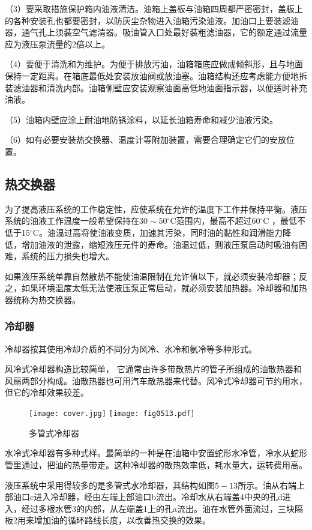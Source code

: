 （3）要采取措施保护箱内油液清洁。油箱上盖板与油箱四周都严密密封，盖板上的各种安装孔也都要密封，以防灰尘杂物进入油箱污染油液。加油口上要装滤油器，通气孔上须装空气滤清器。吸油管入口处最好装粗滤油器，它的额定通过流量应为液压泵流量的2倍以上。

（4）要便于清洗和为维护。为便于排放污油，油箱箱底应做成倾斜形，且与地面保持一定距离。在箱底最低处安装放油阀或放油塞。油箱结构还应考虑能方便地拆装滤油器和清洗内部。油箱侧壁应安装观察油面高低地油面指示器，以便适时补充油液。

（5）油箱内壁应涂上耐油地防锈涂料，以延长油箱寿命和减少油液污染。

（6）如有必要安装热交换器、温度计等附加装置，需要合理确定它们的安放位置。

\subsection{热交换器}

为了提高液压系统的工作稳定性，应使系统在允许的温度下工作并保持平衡。液压系统的油液工作温度一般希望保持在$30 \sim 50^\circ$C范围内，最高不超过60$^\circ$C ，最低不低于15$^\circ$C。油温过高将使油液变质，加速其污染，同时油的黏性和润滑能力降低，增加油液的泄露，缩短液压元件的寿命。油温过低，则液压泵启动时吸油有困难，系统的压力损失也增大。

如果液压系统单靠自然散热不能使油温限制在允许值以下，就必须安装冷却器；反之，如果环境温度太低无法使液压泵正常启动，就必须安装加热器。冷却器和加热器统称为热交换器。
\subsubsection{冷却器}
冷却器按其使用冷却介质的不同分为风冷、水冷和氨冷等多种形式。

风冷式冷却器构造比较简单， 它通常由许多带散热片的管子所组成的油散热器和风扇两部分构成。油散热器也可用汽车散热器来代替。风冷式冷却器可节约用水，但它的冷却效果较差。

\begin{figure}[!hbt]
\centering         
\ifOpenSource
\texttt{[image: cover.jpg]}
\else
\texttt{[image: fig0513.pdf]}
\fi 
\caption{多管式冷却器}   
\label{fig:fig0513}
\end{figure}

水冷式冷却器有多种式样。最简单的一种是在油箱中安置蛇形水冷管，冷水从蛇形管里通过，把油的热量带走。这种冷却器的散热效率低，耗水量大，运转费用高。

液压系统中采用得较多的是多管式水冷却器，其结构如图$5-13$所示。油从右端上部油口c进入冷却器，经由左端上部油口b流出。冷却水从右端盖4中央的孔d进入，经过多根水管3的内部，从左端盖1上的孔a流出。油在水管外面流过，三块隔板2用来增加油的循环路线长度，以改善热交换的效果。

